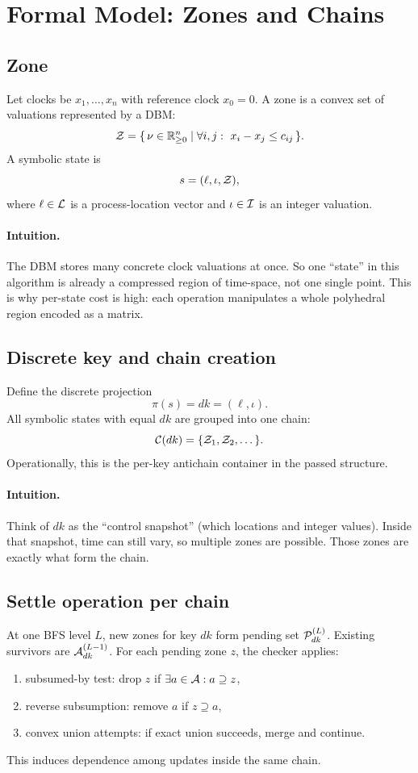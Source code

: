 \section{Formal Model: Zones and Chains}
\subsection{Zone}
Let clocks be $x_1,\dots,x_n$ with reference clock $x_0=0$.
A zone is a convex set of valuations represented by a DBM:
\[
\mathcal{Z} = \{\,\nu \in \mathbb{R}_{\ge 0}^n \mid \forall i,j:\ x_i - x_j \le c_{ij}\,\}.
\]
A symbolic state is
\[
s = (\ell, \iota, \mathcal{Z}),
\]
where $\ell \in \mathcal{L}$ is a process-location vector and $\iota \in \mathcal{I}$ is an integer valuation.

\paragraph{Intuition.}
The DBM stores many concrete clock valuations at once.
So one ``state'' in this algorithm is already a compressed region of time-space, not one single point.
This is why per-state cost is high: each operation manipulates a whole polyhedral region encoded as a matrix.

\subsection{Discrete key and chain creation}
Define the discrete projection
\[
\pi(s) = dk = (\ell,\iota).
\]
All symbolic states with equal $dk$ are grouped into one chain:
\[
\mathcal{C}(dk) = \{\mathcal{Z}_1,\mathcal{Z}_2,\dots\}.
\]
Operationally, this is the per-key antichain container in the passed structure.

\paragraph{Intuition.}
Think of $dk$ as the ``control snapshot'' (which locations and integer values).
Inside that snapshot, time can still vary, so multiple zones are possible.
Those zones are exactly what form the chain.

\subsection{Settle operation per chain}
At one BFS level $L$, new zones for key $dk$ form pending set $\mathcal{P}_{dk}^{(L)}$.
Existing survivors are $\mathcal{A}_{dk}^{(L-1)}$.
For each pending zone $z$, the checker applies:
\begin{enumerate}
  \item subsumed-by test: drop $z$ if $\exists a\in\mathcal{A}: a\supseteq z$,
  \item reverse subsumption: remove $a$ if $z\supseteq a$,
  \item convex union attempts: if exact union succeeds, merge and continue.
\end{enumerate}
This induces dependence among updates inside the same chain.

